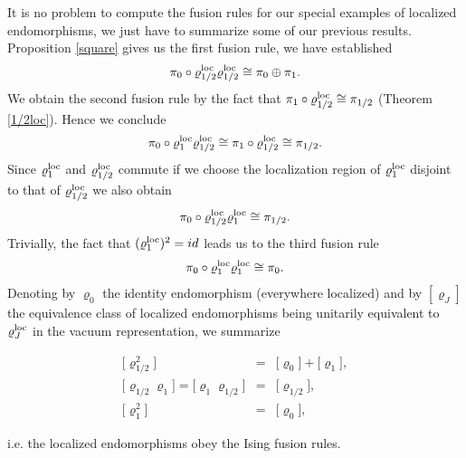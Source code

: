 \documentclass[10pt,a4paper]{article}
\begin{document}
It is no problem to compute the fusion rules
for our special examples of localized
endomorphisms, we just have to summarize
some of our previous results. Proposition
\ref{square} gives us the first fusion rule,
we have established
\[ \pi_0\circ\varrho_{1/2}^{\rm loc}
\varrho_{1/2}^{\rm loc}\cong\pi_0\oplus\pi_1. \]
We obtain the second fusion rule by the fact that
$\pi_1\circ\varrho_{1/2}^{\rm loc}\cong
\pi_{1/2}$ (Theorem \ref{1/2loc}). Hence we conclude
\[ \pi_0\circ\varrho_1^{\rm loc}
\varrho_{1/2}^{\rm loc} \cong
\pi_1\circ\varrho_{1/2}^{\rm loc}\cong
\pi_{1/2}.\]
Since $\varrho_1^{\rm loc}$ and
$\varrho_{1/2}^{\rm loc}$ commute if we choose
the localization region of $\varrho_1^{\rm loc}$
disjoint to that of $\varrho_{1/2}^{\rm loc}$
we also obtain
\[ \pi_0\circ\varrho_{1/2}^{\rm loc}
\varrho_1^{\rm loc}\cong\pi_{1/2}.\]
Trivially, the fact that $(\varrho_1^{\rm loc})^2=id$ leads
us to the third fusion rule
\[ \pi_0 \circ \varrho_1^{\rm loc} \varrho_1^{\rm loc} \cong
\pi_0. \]
Denoting by $\varrho_0$ the identity endomorphism
(everywhere localized) and by $[\varrho_J]$ the
equivalence class of localized endomorphisms being
unitarily equivalent to $\varrho_J^{\rm loc}$ in the
vacuum representation, we summarize
\begin{theorem}
\begin{eqnarray}
{[} \varrho_{1/2}^2 {]} &=&
{[} \varrho_0 {]} + {[} \varrho_1 {]} ,\\
{[} \varrho_{1/2} \varrho_1 {]} =
{[} \varrho_1 \varrho_{1/2} {]}
&=& {[} \varrho_{1/2} {]} ,\\
{[} \varrho_1^2 {]} &=& {[} \varrho_0 {]},
\end{eqnarray}
\end{theorem}
i.e. the localized endomorphisms obey the Ising
fusion rules.
\end{document}
